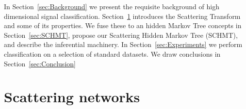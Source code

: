 \documentclass{article}
\begin{document}

  In  Section~\ref{sec:Background}  we  present  the  requisite  background  of high dimensional signal classification. Section~\ref{sec:SCN} introduces the Scattering Transform and some of its properties.   We  fuse these to an hidden Markov Tree concepts in Section~\ref{sec:SCHMT}, propose our Scattering Hidden Markov Tree (SCHMT), and describe the inferential machinery. In Section~\ref{sec:Experiments} we perform classification on a selection of standard datasets. We draw conclusions in Section~\ref{sec:Conclusion}

  

\section{Scattering networks}
  \label{sec:SCN}

\end{document}
